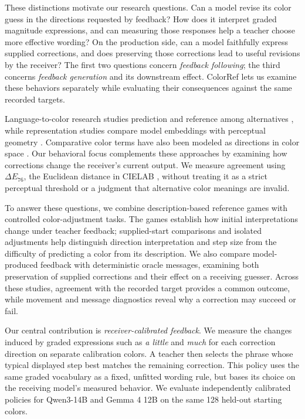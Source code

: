 \documentclass[11pt]{article}
\begin{document}
These distinctions motivate our research questions. Can a model revise
its color guess in the directions requested by feedback? How does it
interpret graded magnitude expressions, and can measuring those responses
help a teacher choose more effective wording? On the production side,
can a model faithfully express supplied corrections, and does preserving
those corrections lead to useful revisions by the receiver? The first two
questions concern \emph{feedback following}; the third concerns
\emph{feedback generation} and its downstream effect. ColorRef lets us
examine these behaviors separately while evaluating their consequences
against the same recorded targets.

Language-to-color research studies prediction and reference among alternatives
\citep{mcmahan2015bayesian,monroe2017colors}, while representation studies
compare model embeddings with perceptual geometry
\citep{abdou-etal-2021-language,loyola-etal-2023-perceptual}.
Comparative color terms have also been modeled as directions in color space
\citep{winn-muresan-2018-lighter}. Our behavioral focus complements these approaches by examining how
corrections change the receiver's current output. We measure agreement using $\Delta E_{76}$, the Euclidean distance in CIELAB
\citep{cie2018colorimetry}, without treating it as a strict perceptual
threshold or a judgment that alternative color meanings are invalid.

To answer these questions, we combine description-based reference games
with controlled color-adjustment tasks. The games establish how initial
interpretations change under teacher feedback; supplied-start comparisons
and isolated adjustments help distinguish direction interpretation and
step size from the difficulty of predicting a color from its description.
We also compare model-produced feedback with deterministic oracle messages,
examining both preservation of supplied corrections and their effect on a
receiving guesser. Across these studies, agreement with the recorded target
provides a common outcome, while movement and message diagnostics reveal
why a correction may succeed or fail.

Our central contribution is \emph{receiver-calibrated feedback}. We
measure the changes induced by graded expressions such as \textit{a little}
and \textit{much} for each correction direction on separate calibration
colors. A teacher then selects the phrase
whose typical displayed step best matches the remaining correction.
This policy uses the same graded vocabulary as a fixed, unfitted wording
rule, but bases its choice on the receiving model's measured behavior.
We evaluate independently calibrated policies for Qwen3-14B and Gemma 4 12B
on the same 128 held-out starting colors.
\end{document}
